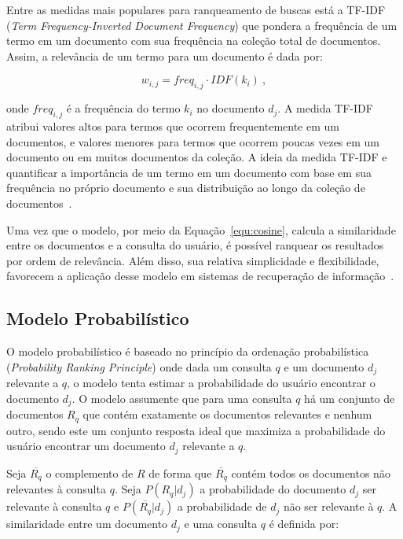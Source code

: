Entre as medidas mais populares para ranqueamento de buscas está a TF-IDF (\textit{Term Frequency-Inverted Document Frequency}) que pondera a frequência de um termo em um documento com sua frequência na coleção total de documentos. Assim, a relevância de um termo para um documento é dada por:

\begin{equation}
	w_{i,j} = freq_{i,j} \cdot IDF(k_i)~,
\end{equation}


\noindent
onde $freq_{i,j}$ é a frequência do termo $k_i$ no documento $d_j$. A medida TF-IDF atribui valores altos para termos que ocorrem frequentemente em um documentos, e valores menores para termos que ocorrem poucas vezes em um documento ou em muitos documentos da coleção. A ideia da medida TF-IDF e quantificar a importância de um termo em um documento com base em sua frequência no próprio documento e sua distribuição ao longo da coleção de documentos~\cite{Croft2009,Salton1988,Shamsinejadbabki2012,Salton:1994}.


Uma vez que o modelo, por meio da Equação~\ref{equ:cosine}, calcula a similaridade entre os documentos e a consulta do usuário, é possível ranquear os resultados por ordem de relevância. Além disso, sua relativa simplicidade e flexibilidade, favorecem a aplicação desse modelo em sistemas de recuperação de informação~\cite{Tan2005,Croft2009,Manning2008}.



\subsection{Modelo Probabilístico}

 
O modelo probabilístico é baseado no princípio da ordenação probabilística (\textit{Probability Ranking Principle}) onde dada um consulta $q$ e um documento $d_j$ relevante a $q$, o modelo tenta estimar a probabilidade do usuário encontrar o documento $d_j$. O modelo assumente que para uma consulta $q$ há um conjunto de documentos $R_q$ que contém exatamente os documentos relevantes e nenhum outro, sendo este um conjunto resposta ideal que maximiza a probabilidade do usuário encontrar um documento $d_j$ relevante a $q$. 

Seja $\overline{R_q}$ o complemento de $R$ de forma que $\overline{R_q}$ contém todos os documentos não relevantes à consulta $q$. Seja $P(R_q|d_j)$ a probabilidade do documento $d_j$ ser relevante à consulta $q$ e $P(\overline{R_q}|d_j)$ a probabilidade de $d_j$ não ser relevante à $q$. A similaridade entre um documento $d_j$ e uma consulta $q$ é definida por:





